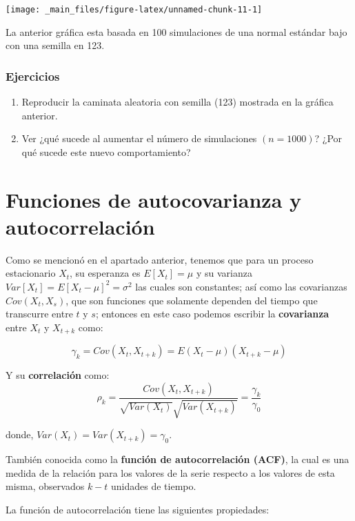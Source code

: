 \documentclass[
  a4paper,
  oneside,
  openany]{book}
\providecommand{\tightlist}{%
  \setlength{\itemsep}{0pt}\setlength{\parskip}{0pt}}
\begin{document}
\begin{center}\texttt{[image: \_main\_files/figure-latex/unnamed-chunk-11-1]} \end{center}

La anterior gráfica esta basada en 100 simulaciones de una normal estándar bajo con una semilla en 123.

\hypertarget{ejercicios}{%
\subsection{Ejercicios}\label{ejercicios}}

\begin{enumerate}
\def\labelenumi{\arabic{enumi})}
\tightlist
\item
  Reproducir la caminata aleatoria con semilla (123) mostrada en la gráfica anterior.
\item
  Ver ¿qué sucede al aumentar el número de simulaciones \((n=1000)\)? ¿Por qué sucede este nuevo comportamiento?
\end{enumerate}

\hypertarget{funciones-de-autocovarianza-y-autocorrelaciuxf3n}{%
\chapter{Funciones de autocovarianza y autocorrelación}\label{funciones-de-autocovarianza-y-autocorrelaciuxf3n}}

Como se mencionó en el apartado anterior, tenemos que para un proceso estacionario \(X_t\), su esperanza es \(E[X_t] = \mu\) y su varianza \(Var[X_t]=E[X_t-\mu]^2=\sigma^2\) las cuales son constantes; así como las covarianzas \(Cov(X_t,X_s)\), que son funciones que solamente dependen del tiempo que transcurre entre \(t\) y \(s\); entonces en este caso podemos escribir la \textbf{covarianza} entre \(X_t\) y \(X_{t+k}\) como:

\[
\gamma_k=Cov(X_t,X_{t+k})=E(X_t-\mu)(X_{t+k}-\mu)
\]

Y su \textbf{correlación} como:
\[
\rho_k =\frac{Cov(X_t,X_{t+k})}{\sqrt{Var(X_t)}\sqrt{Var(X_{t+k})}}=\frac{\gamma_k}{\gamma_0}
\]

donde, \(Var(X_t) = Var(X_{t+k}) = \gamma_0\).

También conocida como la \textbf{función de autocorrelación (ACF)}, la cual es una medida de la relación para los valores de la serie respecto a los valores de esta misma, observados \(k-t\) unidades de tiempo.

La función de autocorrelación tiene las siguientes propiedades:
\end{document}
